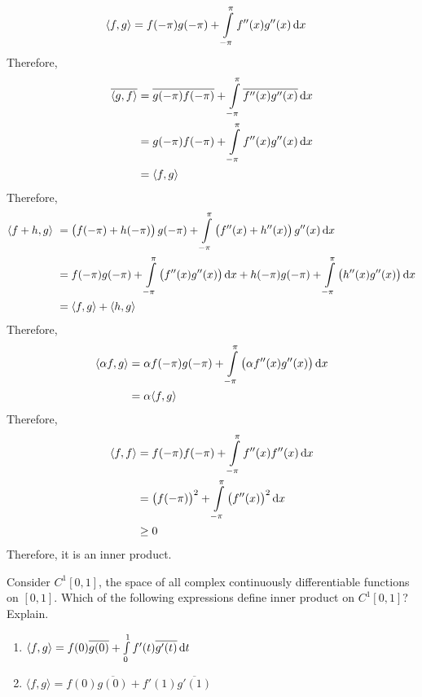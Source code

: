 \documentclass[fleqn, a4paper, 11pt, oneside]{amsart}
\theoremstyle{definition}
\theoremstyle{theorem}
\begin{document}
\begin{solution}
	\begin{align*}
		\langle f,g \rangle & = f(-\pi) g(-\pi) + \int\limits_{-\pi}^{\pi} f''(x) g''(x) \dif x
	\end{align*}
	Therefore,
	\begin{align*}
		\overline{\langle g,f \rangle} & = \overline{g(-\pi) f(-\pi)} + \int\limits_{-\pi}^{\pi} \overline{f''(x) g''(x)} \dif x \\
                                               & = g(-\pi) f(-\pi) + \int\limits_{-\pi}^{\pi} f''(x) g''(x) \dif x                       \\
                                               & = \langle f,g \rangle
	\end{align*}
	Therefore,
	\begin{align*}
		\langle f + h , g \rangle\ & = \left( f(-\pi) + h(-\pi) \right) g(-\pi) + \int\limits_{-\pi}^{\pi} \left( f''(x) + h''(x) \right) g''(x) \dif x                                                    \\
                                           & = f(-\pi) g(-\pi) + \int\limits_{-\pi}^{\pi} \left( f''(x) g''(x) \right) \dif x + h(-\pi) g(-\pi) + \int\limits_{-\pi}^{\pi} \left( h''(x) g''(x) \right) \dif x \\
                                           & = \langle f,g \rangle + \langle h,g \rangle
	\end{align*}
	Therefore,
	\begin{align*}
		\langle \alpha f , g \rangle & = \alpha f(-\pi) g(-\pi) + \int\limits_{-\pi}^{\pi} \left( \alpha f''(x) g''(x) \right) \dif x \\
                                             & = \alpha \langle f,g \rangle
	\end{align*}
	Therefore,
	\begin{align*}
		\langle f,f \rangle & = f(-\pi) f(-\pi) + \int\limits_{-\pi}^{\pi} f''(x) f''(x) \dif x                    \\
                                    & = \left( f(-\pi) \right)^2 + \int\limits_{-\pi}^{\pi} \left( f''(x) \right)^2 \dif x \\
                                    & \ge 0
	\end{align*}
	Therefore, it is an inner product.
\end{solution}

\begin{question}
	Consider $C^1[0,1]$, the space of all complex continuously differentiable functions on $[0,1]$.
	Which of the following expressions define inner product on $C^1[0,1]$?
	Explain.
	\begin{enumerate}
		\item $\langle f,g \rangle = f(0) \overline{g(0)} + \int\limits_{0}^{1} f'(t) \overline{g'(t)} \dif t$
		\item $\langle f,g \rangle = f(0) \overline{g(0)} + f'(1) \overline{g'(1)}$
	\end{enumerate}
\end{question}
\end{document}

